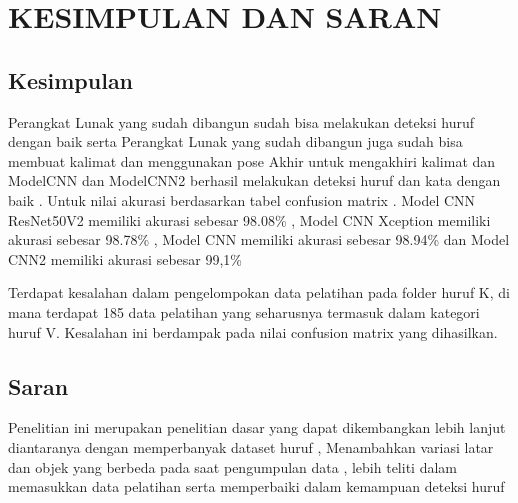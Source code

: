 
\chapter{KESIMPULAN DAN SARAN}

\section{Kesimpulan}
Perangkat Lunak yang sudah dibangun sudah bisa melakukan deteksi huruf dengan baik serta Perangkat Lunak yang sudah dibangun juga sudah bisa membuat kalimat dan menggunakan pose Akhir untuk mengakhiri kalimat dan ModelCNN dan ModelCNN2 berhasil melakukan deteksi huruf dan kata dengan baik . Untuk nilai akurasi berdasarkan tabel confusion matrix . Model CNN ResNet50V2 memiliki akurasi  sebesar 98.08\%  , Model CNN Xception memiliki akurasi  sebesar 98.78\% , Model CNN memiliki akurasi sebesar 98.94\% dan Model CNN2 memiliki akurasi sebesar 99,1\%

Terdapat kesalahan dalam pengelompokan data pelatihan pada folder huruf K, di mana terdapat 185 data pelatihan yang seharusnya termasuk dalam kategori huruf V. Kesalahan ini berdampak pada nilai confusion matrix yang dihasilkan.


\section{Saran}
Penelitian ini merupakan penelitian dasar yang dapat dikembangkan lebih lanjut diantaranya dengan  memperbanyak dataset huruf ,	Menambahkan variasi latar dan objek yang berbeda pada saat pengumpulan data , lebih teliti dalam memasukkan data pelatihan serta memperbaiki dalam kemampuan deteksi huruf